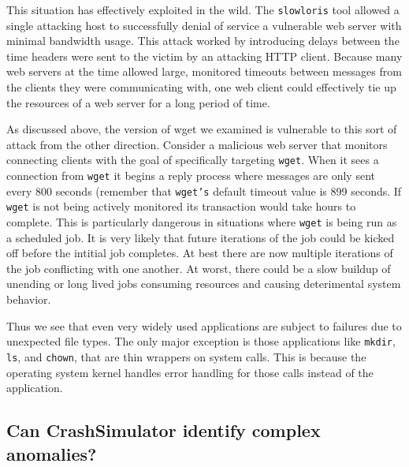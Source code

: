 This situation has effectively exploited in the wild.  The {\tt slowloris} tool allowed a single attacking
host to successfully denial of service a vulnerable web server with minimal bandwidth usage.  This attack
worked by introducing delays between the time headers were sent to the victim by an attacking HTTP client.
Because many web servers at the time allowed large, monitored timeouts between messages from the clients
they were communicating with, one web client could effectively tie up the resources of a web server for a
long period of time.

As discussed above, the version of wget we examined is vulnerable to this sort of attack from the other
direction.  Consider a malicious web server that monitors connecting clients with the goal of specifically
targeting {\tt wget}.  When it sees a connection from {\tt wget} it begins a reply process where messages
are only sent every 800 seconds (remember that {\tt wget's} default timeout value is 899 seconds.  If {\tt
  wget} is not being actively monitored its transaction would take hours to complete.  This is particularly
dangerous in situations where {\tt wget} is being run as a scheduled job.  It is very likely that future
iterations of the job could be kicked off before the intitial job completes.  At best there are now multiple
iterations of the job conflicting with one another.  At worst, there could be a slow buildup of unending or
long lived jobs consuming resources and causing deterimental system behavior.



 Thus we see that even very 
widely used applications are subject to failures due to unexpected file 
types.  The only major exception is those applications like {\tt mkdir}, 
{\tt ls}, and {\tt chown}, that are thin wrappers on system calls.  This 
is because the operating system kernel handles error handling for those 
calls instead of the application.










\subsection{Can CrashSimulator identify complex anomalies?}


